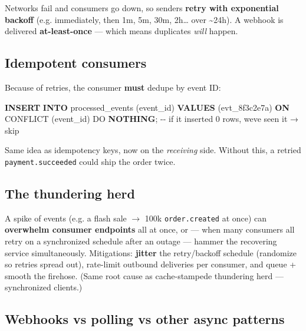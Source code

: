 \documentclass[11pt]{article}
\newenvironment{Shaded}{\begin{snugshade}}{\end{snugshade}}
\newcommand{\CommentTok}[1]{\textcolor[rgb]{0.48,0.49,0.49}{#1}}
\newcommand{\KeywordTok}[1]{\textcolor[rgb]{0.81,0.81,0.76}{\textbf{#1}}}
\newcommand{\NormalTok}[1]{\textcolor[rgb]{0.81,0.81,0.76}{#1}}
\newcommand{\StringTok}[1]{\textcolor[rgb]{0.96,0.31,0.31}{#1}}
\begin{document}
Networks fail and consumers go down, so senders \textbf{retry with exponential backoff} (e.g. immediately, then 1m, 5m, 30m, 2h\ldots{} over \textasciitilde24h). A webhook is delivered \textbf{at-least-once} --- which means duplicates \emph{will} happen.

\subsection{Idempotent consumers}\label{idempotent-consumers}

Because of retries, the consumer \textbf{must} dedupe by event ID:


\begin{Shaded}
\begin{Highlighting}[]
\KeywordTok{INSERT} \KeywordTok{INTO}\NormalTok{ processed\_events (event\_id) }\KeywordTok{VALUES}\NormalTok{ (}\StringTok{\textquotesingle{}evt\_8f3c2e7a\textquotesingle{}}\NormalTok{)}
\KeywordTok{ON}\NormalTok{ CONFLICT (event\_id) DO }\KeywordTok{NOTHING}\NormalTok{;     }\CommentTok{{-}{-} if it inserted 0 rows, we\textquotesingle{}ve seen it → skip}
\end{Highlighting}
\end{Shaded}

Same idea as idempotency keys, now on the \emph{receiving} side. Without this, a retried \texttt{payment.succeeded} could ship the order twice.

\subsection{The thundering herd}\label{the-thundering-herd}

A spike of events (e.g. a flash sale \(\rightarrow\) 100k \texttt{order.created} at once) can \textbf{overwhelm consumer endpoints} all at once, or --- when many consumers all retry on a synchronized schedule after an outage --- hammer the recovering service simultaneously. Mitigations: \textbf{jitter} the retry/backoff schedule (randomize so retries spread out), rate-limit outbound deliveries per consumer, and queue + smooth the firehose. (Same root cause as cache-stampede thundering herd --- synchronized clients.)

\subsection{Webhooks vs polling vs other async patterns}\label{webhooks-vs-polling-vs-other-async-patterns}
\end{document}
